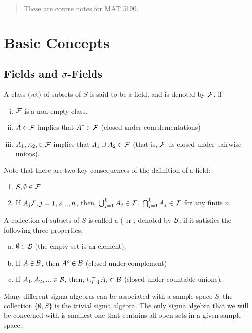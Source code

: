 \begin{abstract}
    These are course notes for MAT 5190.
\end{abstract}



\section{Basic Concepts}
\subsection{Fields and $\sigma$-Fields}
\begin{definition}
    A class (set) of subsets of $S$ is said to be a field, and is denoted by $\mathcal F$, if 
    \begin{enumerate}[(i)]
        \item $\mathcal F$ is a non-empty class.
        \item $A \in \mathcal F$ implies that $A^c \in \mathcal F$ (closed under complementations)
        \item $A_1, A_2, \in \mathcal F$ implies that $A_1 \cup A_2 \in \mathcal F$ (that is, $\mathcal F$ us closed under pairwise unions).
    \end{enumerate}
\end{definition}
Note that there are two key consequences of the definition of a field:
\begin{enumerate}
    \item $S, \emptyset \in \mathcal F$
    \item If $A_j \mathcal F, j =1,2,..,n$, then, $\bigcup_{j=1}^{k}A_{j} \in \mathcal F$, $\bigcap_{j=1}^{k}A_{j} \in \mathcal F$ for any finite $n$.
\end{enumerate}


\begin{definition}
    A collection of subsets of $S$ is called a  ( or , denoted by $\mathcal B$, if it satisfies the following three properties:
    
    \begin{enumerate}[(a)]
        \item $\emptyset \in \mathcal B$ (the empty set is an element).
        \item If $A \in \mathcal B$, then $A^c \in \mathcal B$ (closed under complement) 
        \item If $A_1, A_2, ... \in \mathcal B$, then, $\cup_{i=1}^{\infty}A_i \in \mathcal B$ (closed under countable unions).
    \end{enumerate}
\end{definition}
Many different sigma algebras can be associated with a sample space $S$, the collection $\{\emptyset, S\}$ is the trivial sigma algebra. The only sigma algebra that we will be concerned with is smallest one that contains all open sets in a given sample space.

